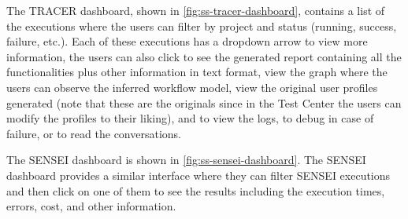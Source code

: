 The \ac{TRACER} dashboard,
shown in \autoref{fig:ss-tracer-dashboard},
contains a list of the executions
where the users can filter by project and status (running, success, failure, etc.).
Each of these executions has a dropdown arrow to view more information,
the users can also click to see the generated report
containing all the functionalities plus other information in text format,
view the graph where the users can observe the inferred workflow model,
view the original user profiles generated
(note that these are the originals since in the Test Center
the users can modify the profiles to their liking),
and to view the logs, to debug in case of failure, or to read the conversations.



The SENSEI dashboard is shown in \autoref{fig:ss-sensei-dashboard}.
The SENSEI dashboard provides a similar interface
where they can filter SENSEI executions
and then click on one of them to see the results
including the execution times,
errors, cost, and other information.
